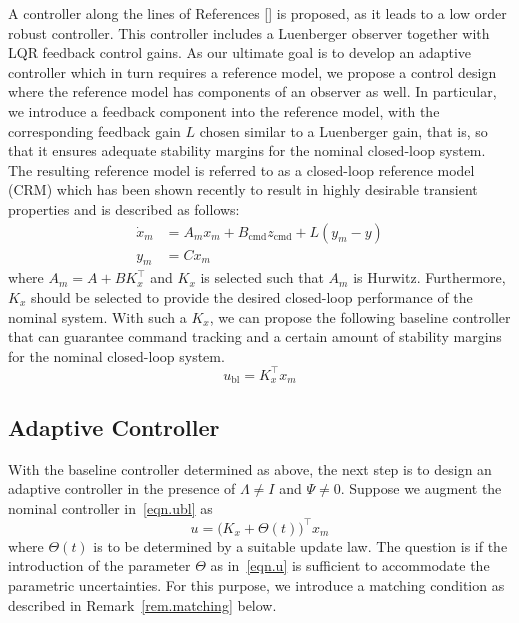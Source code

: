 \documentclass[]{../sty/aiaa-tc}
\begin{document}
  A controller along the lines of References [] is proposed, as it leads to a low order robust controller.
  This controller includes a Luenberger observer together with LQR feedback control gains.
  As our ultimate goal is to develop an adaptive controller which in turn requires a reference model, we propose a control design where the reference model has components of an observer as well.
  In particular, we introduce a feedback component into the reference model, with the corresponding feedback gain $L$ chosen similar to a Luenberger gain, that is, so that it ensures adequate stability margins for the nominal closed-loop system.
  The resulting reference model is referred to as a closed-loop reference model (CRM) which has been shown recently to result in highly desirable transient properties\cite{gibson.aiaacrm.2012,gibson.ecc.2013,gibson.ieeeaccess.2013,gibson.acc.2013} and is described as follows:
  \begin{equation}
    \begin{split}
      \label{eqn.refmodel}
      \dot{x}_{m}&=A_{m}x_{m}+B_{\text{cmd}}z_{\text{cmd}}+L(y_{m}-y) \\
      y_{m}&=Cx_{m}
    \end{split}
  \end{equation}
  where $A_{m}=A+BK_{x}^{\top}$ and $K_{x}$ is selected such that $A_{m}$ is Hurwitz.
  Furthermore, $K_{x}$ should be selected to provide the desired closed-loop performance of the nominal system.
  With such a $K_{x}$, we can propose the following baseline controller that can guarantee command tracking and a certain amount of stability margins for the nominal closed-loop system.
  \begin{equation}
    \label{eqn.ubl}
    u_{\text{bl}}=K_{x}^{\top}x_{m}
  \end{equation}

  \subsection{Adaptive Controller}

  With the baseline controller determined as above, the next step is to design an adaptive controller in the presence of $\Lambda\neq I$ and $\Psi\neq 0$.
  Suppose we augment the nominal controller in\ \eqref{eqn.ubl} as
  \begin{equation}
    \label{eqn.u}
    u=\bigr(K_{x}+\Theta(t)\bigr)^{\top}x_{m}
  \end{equation}
  where $\Theta(t)$ is to be determined by a suitable update law.
  The question is if the introduction of the parameter $\Theta$ as in\ \eqref{eqn.u} is sufficient to accommodate the parametric uncertainties.
  For this purpose, we introduce a matching condition as described in Remark~\ref{rem.matching} below.
\end{document}
